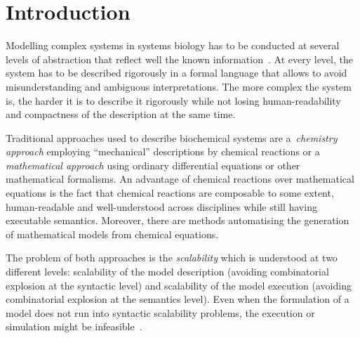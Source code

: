 \documentclass[11pt,a4paper]{report}
\newcounter{counter}[section]
\begin{document}


\pagestyle{plain}

\tableofcontents
\newpage

\setcounter{page}{0}


\chapter{Introduction} \label{chap:intro}

Modelling complex systems in systems biology has to be conducted at several levels of abstraction that reflect well the known information~\cite{Kitano}. At every level, the system has to be described rigorously in a formal language that allows to avoid
misunderstanding and ambiguous interpretations. The more complex the system is, the harder it is to describe it rigorously while not losing human-readability and compactness of the description at the same time.

Traditional approaches used to describe biochemical systems are a~\emph{chemistry approach} employing ``mechanical'' descriptions by chemical reactions or a \emph{mathematical approach} using ordinary differential equations or other mathematical formalisms. An advantage of chemical reactions over mathematical equations is the fact that chemical reactions are composable to some extent, human-readable and well-understood across disciplines while still having executable semantics. 
Moreover, there are methods automatising the generation of mathematical models from chemical equations.

The problem of both approaches is the \emph{scalability} which is understood at two
different levels: scalability of the model description (avoiding combinatorial explosion at the syntactic level) and scalability of the model execution (avoiding combinatorial explosion at the semantics level). Even when the formulation of a model does not run into syntactic scalability problems, the execution or simulation might be infeasible~\cite{Romers107136}. 
\end{document}
